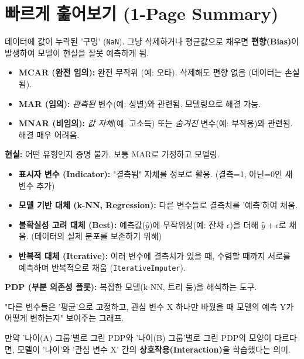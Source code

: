 \documentclass[11pt,a4paper]{book}
\theoremstyle{definition}
\begin{document}
\section{빠르게 훑어보기 (1-Page Summary)}

\begin{tcolorbox}[title={1. 결측치(Missingness)란?}]
데이터에 값이 누락된 '구멍' (\texttt{NaN}).
그냥 삭제하거나 평균값으로 채우면 \textbf{편향(Bias)}이 발생하여 모델이 현실을 잘못 예측하게 됨.
\end{tcolorbox}

\begin{tcolorbox}[title={2. 결측의 3유형 (원인)}]
    \begin{itemize}
        \item \textbf{MCAR (완전 임의):} 완전 무작위 (예: 오타). 삭제해도 편향 없음 (데이터는 손실됨).
        \item \textbf{MAR (임의):} \textit{관측된} 변수(예: 성별)와 관련됨. 모델링으로 해결 가능.
        \item \textbf{MNAR (비임의):} \textit{값 자체}(예: 고소득) 또는 \textit{숨겨진} 변수(예: 부작용)와 관련됨. 해결 매우 어려움.
    \end{itemize}
    \textbf{현실:} 어떤 유형인지 증명 불가. 보통 MAR로 가정하고 모델링.
\end{tcolorbox}

\begin{tcolorbox}[title={3. 결측치 처리(Imputation) 전략}]
    \begin{itemize}
        \item \textbf{표시자 변수 (Indicator):} "결측됨" 자체를 정보로 활용. (결측=1, 아닌=0인 새 변수 추가)
        \item \textbf{모델 기반 대체 (k-NN, Regression):} 다른 변수들로 결측치를 '예측'하여 채움.
        \item \textbf{불확실성 고려 대체 (Best):} 예측값(\(\hat{y}\))에 무작위성(예: 잔차 \(\epsilon\))을 더해 \(\hat{y}+\epsilon\)로 채움. (데이터의 실제 분포를 보존하기 위해)
        \item \textbf{반복적 대체 (Iterative):} 여러 변수에 결측치가 있을 때, 수렴할 때까지 서로를 예측하며 반복적으로 채움 (\texttt{IterativeImputer}).
    \end{itemize}
\end{tcolorbox}

\begin{tcolorbox}[title={4. 블랙박스 모델 해석 (PDP)}]
    \textbf{PDP (부분 의존성 플롯):} 복잡한 모델(k-NN, 트리 등)을 해석하는 도구.

    "다른 변수들은 '평균'으로 고정하고, 관심 변수 X 하나만 바꿨을 때 모델의 예측 Y가 어떻게 변하는지" 보여주는 그래프.

    만약 '나이(A) 그룹'별로 그린 PDP와 '나이(B) 그룹'별로 그린 PDP의 모양이 다르다면, 모델이 '나이'와 '관심 변수 X' 간의 \textbf{상호작용(Interaction)}을 학습했다는 의미.
\end{tcolorbox}
\end{document}
